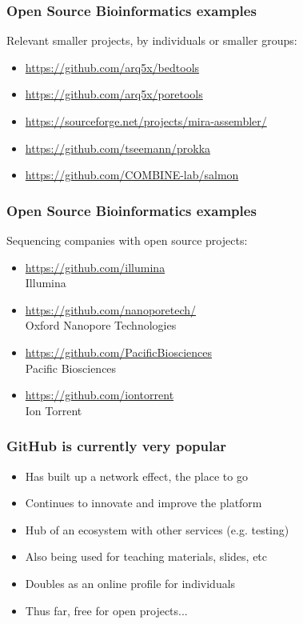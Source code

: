 \begin{frame}
  \frametitle{Open Source Bioinformatics examples}
  Relevant smaller projects, by individuals or smaller groups:
  \begin{itemize}
    \item \url{https://github.com/arq5x/bedtools}
    \item \url{https://github.com/arq5x/poretools}
    \item \url{https://sourceforge.net/projects/mira-assembler/}
    \item \url{https://github.com/tseemann/prokka}
    \item \url{https://github.com/COMBINE-lab/salmon}
  \end{itemize}
\end{frame}

\begin{frame}
  \frametitle{Open Source Bioinformatics examples}
  Sequencing companies with open source projects:
  \begin{itemize}
    \item \url{https://github.com/illumina} \\ Illumina
    \item \url{https://github.com/nanoporetech/} \\ Oxford Nanopore Technologies
    \item \url{https://github.com/PacificBiosciences} \\ Pacific Biosciences
    \item \url{https://github.com/iontorrent} \\ Ion Torrent
  \end{itemize}
\end{frame}

\begin{frame}
  \frametitle{GitHub is currently very popular}
  \begin{itemize}
    \item Has built up a network effect, the place to go
    \item Continues to innovate and improve the platform
    \item Hub of an ecosystem with other services (e.g. testing)
    \item Also being used for teaching materials, slides, etc
    \item Doubles as an online profile for individuals
    \item Thus far, free for open projects...
  \end{itemize}
\end{frame}

